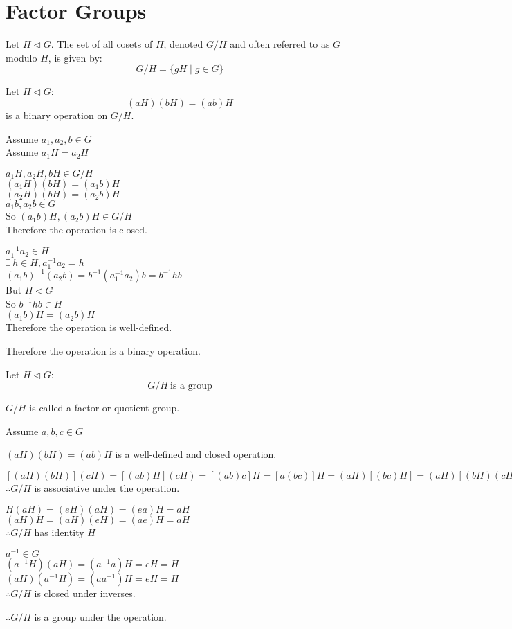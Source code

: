 \documentclass[letterpaper,12pt,fleqn]{article}
\newcommand{\n}{\mathrel{\triangleleft}}
\begin{document}
\section*{Factor Groups}

\begin{definition}
  Let $H\n G$. The set of all cosets of $H$, denoted $G/H$ and often referred
  to as $G$ modulo $H$, is given by:
  \[G/H=\{gH\mid g\in G\}\]
\end{definition}

\begin{theorem}
  Let $H\n G$:
  \[(aH)(bH)=(ab)H\]
  is a binary operation on $G/H$.
\end{theorem}

\begin{theproof}
  Assume $a_1,a_2,b\in G$ \\
  Assume $a_1H=a_2H$

  $a_1H,a_2H,bH\in G/H$ \\
  $(a_1H)(bH)=(a_1b)H$ \\
  $(a_2H)(bH)=(a_2b)H$ \\
  $a_1b,a_2b\in G$ \\
  So $(a_1b)H,(a_2b)H\in G/H$ \\
  Therefore the operation is closed.

  $a_1^{-1}a_2\in H$ \\
  $\exists\,h\in H,a_1^{-1}a_2=h$ \\
  $(a_1b)^{-1}(a_2b)=b^{-1}(a_1^{-1}a_2)b=b^{-1}hb$ \\
  But $H\n G$ \\
  So $b^{-1}hb\in H$ \\
  $(a_1b)H=(a_2b)H$ \\
  Therefore the operation is well-defined.

  Therefore the operation is a binary operation.
\end{theproof}

\begin{theorem}
  Let $H\n G$:
  \[G/H\ \mbox{is a group}\]
\end{theorem}

$G/H$ is called a factor or quotient group.
\newpage
\begin{theproof}
  Assume $a,b,c\in G$

  $(aH)(bH)=(ab)H$ is a well-defined and closed operation.

  $[(aH)(bH)](cH)=[(ab)H](cH)=[(ab)c]H=[a(bc)]H=(aH)[(bc)H]=(aH)[(bH)(cH)]$ \\
  $\therefore G/H$ is associative under the operation.

  $H(aH)=(eH)(aH)=(ea)H=aH$ \\
  $(aH)H=(aH)(eH)=(ae)H=aH$ \\
  $\therefore G/H$ has identity $H$

  $a^{-1}\in G$ \\
  $(a^{-1}H)(aH)=(a^{-1}a)H=eH=H$ \\
  $(aH)(a^{-1}H)=(aa^{-1})H=eH=H$ \\
  $\therefore G/H$ is closed under inverses.

  $\therefore G/H$ is a group under the operation.
\end{theproof}
\end{document}

